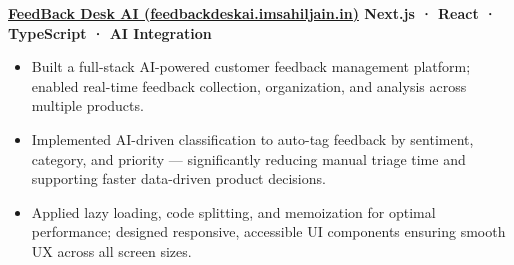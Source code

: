 \documentclass[10pt, letterpaper]{article}
\newcommand{\projentry}[1]{%
  \vspace{2pt}\noindent\textbf{#1}\par\vspace{3pt}
}
\begin{document}
\projentry{\href{https://feedbackdeskai.imsahiljain.in}{FeedBack Desk AI (feedbackdeskai.imsahiljain.in)} \textbar{} Next.js · React · TypeScript · AI Integration}

\begin{itemize}
  \item Built a full-stack AI-powered customer feedback management platform; enabled real-time feedback collection, organization, and analysis across multiple products.
  \item Implemented AI-driven classification to auto-tag feedback by sentiment, category, and priority — significantly reducing manual triage time and supporting faster data-driven product decisions.
  \item Applied lazy loading, code splitting, and memoization for optimal performance; designed responsive, accessible UI components ensuring smooth UX across all screen sizes.
\end{itemize}

\end{document}
